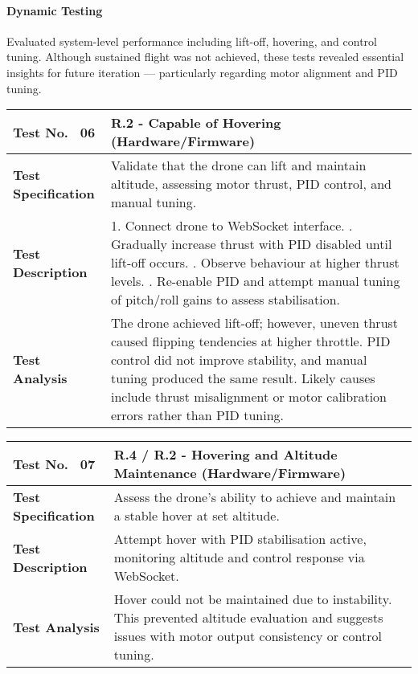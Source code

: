 \paragraph{Dynamic Testing} \leavevmode

Evaluated system-level performance including lift-off, hovering, and control tuning. Although sustained flight was not achieved, these tests revealed essential insights for future iteration — particularly regarding motor alignment and PID tuning. 

\begin{table}[H]
\centering
\renewcommand{\arraystretch}{1.2}
\begin{tabular}{|p{3.5cm}|p{12cm}|}
\hline
\textbf{Test No. \, 06} & \textbf{R.2 - Capable of Hovering} (Hardware/Firmware) \\ \hline
\textbf{Test Specification} & 
Validate that the drone can lift and maintain altitude, assessing motor thrust, PID control, and manual tuning. \\ \hline
\textbf{Test Description} & 
1. Connect drone to WebSocket interface. \newline
2. Gradually increase thrust with PID disabled until lift-off occurs. \newline
3. Observe behaviour at higher thrust levels. \newline
4. Re-enable PID and attempt manual tuning of pitch/roll gains to assess stabilisation. \\ \hline
\textbf{Test Analysis} & 
The drone achieved lift-off; however, uneven thrust caused flipping tendencies at higher throttle. PID control did not improve stability, and manual tuning produced the same result. Likely causes include thrust misalignment or motor calibration errors rather than PID tuning. \\ \hline
\end{tabular}
\end{table}

\begin{table}[H]
\centering
\renewcommand{\arraystretch}{1.2}
\begin{tabular}{|p{3.5cm}|p{12cm}|}
\hline
\textbf{Test No. \, 07} & \textbf{R.4 / R.2 - Hovering and Altitude Maintenance} (Hardware/Firmware) \\ \hline
\textbf{Test Specification} & 
Assess the drone's ability to achieve and maintain a stable hover at set altitude. \\ \hline
\textbf{Test Description} & 
Attempt hover with PID stabilisation active, monitoring altitude and control response via WebSocket. \\ \hline
\textbf{Test Analysis} & 
Hover could not be maintained due to instability. This prevented altitude evaluation and suggests issues with motor output consistency or control tuning. \\ \hline
\end{tabular}
\end{table}

